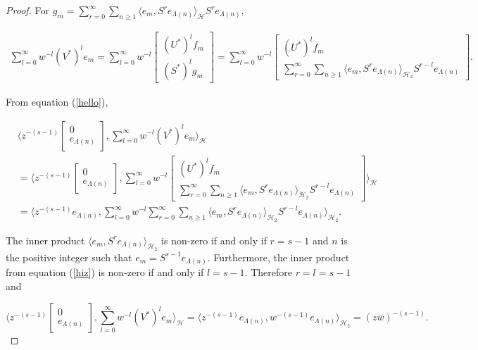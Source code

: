 \documentclass[10pt, reqno]{amsart}
\theoremstyle{definition}
\numberwithin{equation}{section}
\begin{document}
\begin{proof}
For $g_{m}=\sum_{r=0}^{\infty}\sum_{n\geq 1} \big\langle e_{m}, S^{r}e_{\Lambda(n)}\big\rangle_{\mathcal{H}}S^{r}e_{\Lambda(n)}$,

\begin{align*}\sum_{l=0}^{\infty}w^{-l}(V^{*})^{l}e_{m}=\sum_{l=0}^{\infty}w^{-l}\begin{bmatrix}
    (U^{*})^{l}f_{m}\\
    (S^{*})^{l}g_{m}
\end{bmatrix}=\sum_{l=0}^{\infty}w^{-l}\begin{bmatrix}
    (U^{*})^{l}f_{m}\\
    \sum_{r=0}^{\infty}\sum_{n\geq 1}\langle e_{m},S^{r}e_{\Lambda(n)}\rangle_{\mathcal{H}_{2}}S^{r-l}e_{\Lambda(n)}
\end{bmatrix}.
\end{align*}

From equation (\ref{hello}), 

\begin{align}
&\bigg\langle z^{-(s-1)}\begin{bmatrix}
0\\
e_{\Lambda(n)}\end{bmatrix},
\sum_{l=0}^{\infty}w^{-l}(V^{*})^{l}e_{m}\bigg\rangle_{\mathcal{H}} \nonumber\\
&= \bigg\langle z^{-(s-1)}\begin{bmatrix}
0\\
e_{\Lambda(n)}\end{bmatrix}, \sum_{l=0}^{\infty}w^{-l}\begin{bmatrix}
    (U^{*})^{l}f_{m}\\
    \sum_{r=0}^{\infty}\sum_{n\geq 1}\langle e_{m},S^{r}e_{\Lambda(n)}\rangle_{\mathcal{H}_{2}}S^{r-l}e_{\Lambda(n)}
\end{bmatrix}\bigg\rangle_{\mathcal{H}}\nonumber\\
&=\bigg\langle z^{-(s-1)}
e_{\Lambda(n)}, \sum_{l=0}^{\infty}w^{-l}
    \sum_{r=0}^{\infty}\sum_{n\geq 1}\langle e_{m},S^{r}e_{\Lambda(n)}\rangle_{\mathcal{H}_{2}}S^{r-l}e_{\Lambda(n)}
\bigg\rangle_{\mathcal{H}_{2}}.\label{hiz}
\end{align}

\noindent The inner product $\langle e_{m},S^{r}e_{\Lambda(n)}\rangle_{\mathcal{H}_{2}}$ is non-zero if and only if $r=s-1$ and $n$ is the positive integer such that $e_{m}=S^{s-1}e_{\Lambda(n)}$. Furthermore, the inner product from equation (\ref{hiz}) is non-zero if and only if $l=s-1$. Therefore $r=l=s-1$ and

$$\bigg\langle z^{-(s-1)}\begin{bmatrix}
0\\
e_{\Lambda(n)}\end{bmatrix},
\sum_{l=0}^{\infty}w^{-l}(V^{*})^{l}e_{m}\bigg\rangle_{\mathcal{H}} = \bigg\langle z^{-(s-1)}
e_{\Lambda(n)},
w^{-(s-1)}e_{\Lambda(n)}\bigg\rangle_{\mathcal{H}_{2}}=(z\overline{w})^{-(s-1)}.$$


\end{proof}
\end{document}
